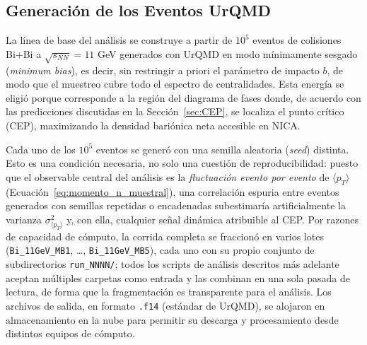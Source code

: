 
\subsection{Generación de los Eventos UrQMD}
\label{sec:generacion_urqmd}

\noindent
La línea de base del análisis se construye a partir de $10^{5}$ eventos de
colisiones Bi+Bi a $\sqrt{s_{NN}} = 11$ GeV generados con UrQMD en modo
mínimamente sesgado (\textit{minimum bias}), es decir, sin restringir a priori
el parámetro de impacto $b$, de modo que el muestreo cubre todo el espectro
de centralidades. Esta energía se eligió porque corresponde a la región del
diagrama de fases donde, de acuerdo con las predicciones discutidas en la
Sección~\ref{sec:CEP}, se localiza el punto crítico (CEP), maximizando la
densidad bariónica neta accesible en NICA.

\noindent
Cada uno de los $10^{5}$ eventos se generó con una semilla aleatoria
(\textit{seed}) distinta. Esto es una condición necesaria, no solo una
cuestión de reproducibilidad: puesto que el observable central del análisis
es la \emph{fluctuación evento por evento} de $\langle p_T \rangle$
(Ecuación~\ref{eq:momento_n_muestral}), una correlación espuria entre
eventos generados con semillas repetidas o encadenadas subestimaría
artificialmente la varianza $\sigma^2_{\langle p_T \rangle}$ y, con ella,
cualquier señal dinámica atribuible al CEP. Por razones de capacidad de
cómputo, la corrida completa se fraccionó en varios lotes
(\texttt{Bi\_11GeV\_MB1}, \dots, \texttt{Bi\_11GeV\_MB5}), cada uno con su
propio conjunto de subdirectorios \texttt{run\_NNNN/}; todos los scripts de
análisis descritos más adelante aceptan múltiples carpetas como entrada y
las combinan en una sola pasada de lectura, de forma que la fragmentación es
transparente para el análisis. Los archivos de salida, en formato
\texttt{.f14} (estándar de UrQMD), se alojaron en almacenamiento en la nube
para permitir su descarga y procesamiento desde distintos equipos de
cómputo.


